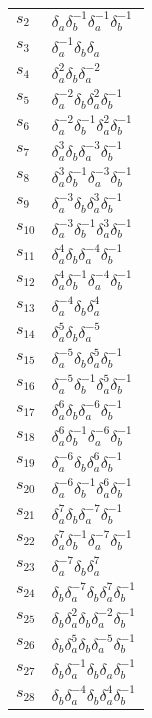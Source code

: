 \documentclass{article}
\begin{document}
\begin{center}
\begin{tabular}{ll}
$s_{2}$ & $\delta_a^{}\delta_b^{-1}\delta_a^{-1}\delta_b^{-1}$ \\
$s_{3}$ & $\delta_a^{-1}\delta_b^{}\delta_a^{}$ \\
$s_{4}$ & $\delta_a^{2}\delta_b^{}\delta_a^{-2}$ \\
$s_{5}$ & $\delta_a^{-2}\delta_b^{}\delta_a^{2}\delta_b^{-1}$ \\
$s_{6}$ & $\delta_a^{-2}\delta_b^{-1}\delta_a^{2}\delta_b^{-1}$ \\
$s_{7}$ & $\delta_a^{3}\delta_b^{}\delta_a^{-3}\delta_b^{-1}$ \\
$s_{8}$ & $\delta_a^{3}\delta_b^{-1}\delta_a^{-3}\delta_b^{-1}$ \\
$s_{9}$ & $\delta_a^{-3}\delta_b^{}\delta_a^{3}\delta_b^{-1}$ \\
$s_{10}$ & $\delta_a^{-3}\delta_b^{-1}\delta_a^{3}\delta_b^{-1}$ \\
$s_{11}$ & $\delta_a^{4}\delta_b^{}\delta_a^{-4}\delta_b^{-1}$ \\
$s_{12}$ & $\delta_a^{4}\delta_b^{-1}\delta_a^{-4}\delta_b^{-1}$ \\
$s_{13}$ & $\delta_a^{-4}\delta_b^{}\delta_a^{4}$ \\
$s_{14}$ & $\delta_a^{5}\delta_b^{}\delta_a^{-5}$ \\
$s_{15}$ & $\delta_a^{-5}\delta_b^{}\delta_a^{5}\delta_b^{-1}$ \\
$s_{16}$ & $\delta_a^{-5}\delta_b^{-1}\delta_a^{5}\delta_b^{-1}$ \\
$s_{17}$ & $\delta_a^{6}\delta_b^{}\delta_a^{-6}\delta_b^{-1}$ \\
$s_{18}$ & $\delta_a^{6}\delta_b^{-1}\delta_a^{-6}\delta_b^{-1}$ \\
$s_{19}$ & $\delta_a^{-6}\delta_b^{}\delta_a^{6}\delta_b^{-1}$ \\
$s_{20}$ & $\delta_a^{-6}\delta_b^{-1}\delta_a^{6}\delta_b^{-1}$ \\
$s_{21}$ & $\delta_a^{7}\delta_b^{}\delta_a^{-7}\delta_b^{-1}$ \\
$s_{22}$ & $\delta_a^{7}\delta_b^{-1}\delta_a^{-7}\delta_b^{-1}$ \\
$s_{23}$ & $\delta_a^{-7}\delta_b^{}\delta_a^{7}$ \\
$s_{24}$ & $\delta_b^{}\delta_a^{-7}\delta_b^{}\delta_a^{7}\delta_b^{-1}$ \\
$s_{25}$ & $\delta_b^{}\delta_a^{2}\delta_b^{}\delta_a^{-2}\delta_b^{-1}$ \\
$s_{26}$ & $\delta_b^{}\delta_a^{5}\delta_b^{}\delta_a^{-5}\delta_b^{-1}$ \\
$s_{27}$ & $\delta_b^{}\delta_a^{-1}\delta_b^{}\delta_a^{}\delta_b^{-1}$ \\
$s_{28}$ & $\delta_b^{}\delta_a^{-4}\delta_b^{}\delta_a^{4}\delta_b^{-1}$ \\
\bottomrule
\end{tabular}
\end{center}

\thispagestyle{empty}
\end{document}
